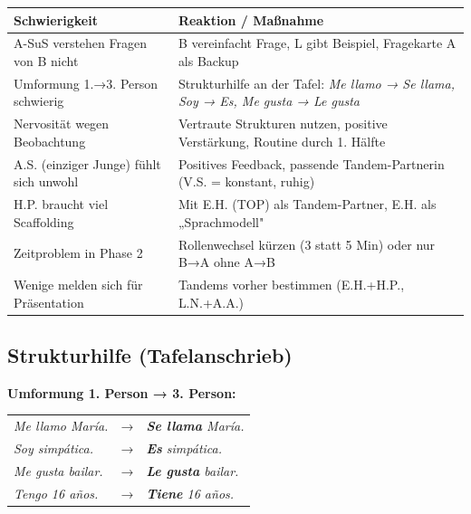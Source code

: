 \documentclass[11pt, a4paper]{article}
\newcommand{\es}[1]{\textcolor{spanisch}{\textit{#1}}}
\begin{document}
\begin{center}
\begin{tabular}{|p{4.5cm}|p{8cm}|}
    \hline
    \textbf{Schwierigkeit} & \textbf{Reaktion / Maßnahme} \\
    \hline
    A-SuS verstehen Fragen von B nicht & B vereinfacht Frage, L gibt Beispiel, Fragekarte A als Backup \\
    \hline
    Umformung 1.→3. Person schwierig & Strukturhilfe an der Tafel: \es{Me llamo → Se llama, Soy → Es, Me gusta → Le gusta} \\
    \hline
    Nervosität wegen Beobachtung & Vertraute Strukturen nutzen, positive Verstärkung, Routine durch 1. Hälfte \\
    \hline
    A.S. (einziger Junge) fühlt sich unwohl & Positives Feedback, passende Tandem-Partnerin (V.S. = konstant, ruhig) \\
    \hline
    H.P. braucht viel Scaffolding & Mit E.H. (TOP) als Tandem-Partner, E.H. als „Sprachmodell" \\
    \hline
    Zeitproblem in Phase 2 & Rollenwechsel kürzen (3 statt 5 Min) oder nur B→A ohne A→B \\
    \hline
    Wenige melden sich für Präsentation & Tandems vorher bestimmen (E.H.+H.P., L.N.+A.A.) \\
    \hline
\end{tabular}
\end{center}

\subsection{Strukturhilfe (Tafelanschrieb)}

\begin{infobox}
\textbf{Umformung 1. Person → 3. Person:}

\begin{tabular}{lcl}
    \es{Me llamo María.} & → & \es{\textbf{Se llama} María.} \\
    \es{Soy simpática.} & → & \es{\textbf{Es} simpática.} \\
    \es{Me gusta bailar.} & → & \es{\textbf{Le gusta} bailar.} \\
    \es{Tengo 16 años.} & → & \es{\textbf{Tiene} 16 años.} \\
\end{tabular}
\end{infobox}

\end{document}
